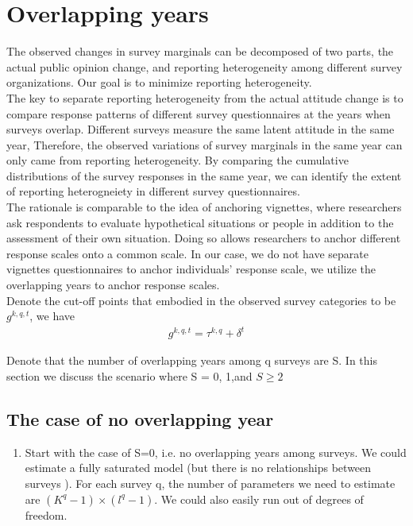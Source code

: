 \documentclass{article}
\begin{document}
 
\section{Overlapping years}
 The observed changes in survey marginals can be decomposed of two parts, the actual public opinion change, and reporting heterogeneity among different survey organizations. Our goal is to minimize reporting heterogeneity.  \\
 
 
 The key to separate reporting heterogeneity from the actual attitude change is to compare response patterns of different survey questionnaires at the  years when surveys overlap.  Different surveys measure the same latent attitude in the same year,  Therefore, the observed variations of survey marginals in the same year can only came from reporting heterogeneity. By comparing  the cumulative distributions of the survey responses in the same year, we can identify the extent of reporting heterogneiety in different survey questionnaires. \\
 
 The rationale is comparable to the idea of anchoring vignettes, where researchers ask respondents to  evaluate hypothetical situations or people in addition to the assessment of their own situation. Doing so allows researchers to anchor different response scales onto a common scale.  In our case, we do not have separate vignettes questionnaires to anchor individuals' response scale, we utilize the overlapping years to anchor response scales.  \\

 Denote the cut-off points that embodied in the observed survey categories  to be $ g^{k,q,t}$, we have 
 \\
      \begin{align}\label{eq3}
          g^{k,q,t}=\tau^{k,q}+\delta^t
      \end{align}
     

 Denote that the number of overlapping years among q surveys are S. In this section we discuss the scenario where  S = 0, 1,and  $S\geq  2$ 

\subsection{The case of no overlapping year}
 \begin{enumerate}
    \item Start with the case of S=0, i.e. no overlapping years among surveys. We could estimate a fully saturated model (but there is no relationships between  surveys ).  For each survey q, the number of parameters we need to estimate are $(K^q - 1)\times (l^q -1)$. We could also easily run out of degrees of freedom. 
\end{enumerate}
\end{document}
